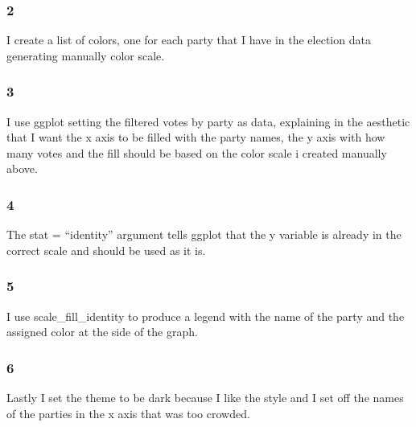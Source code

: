 \documentclass[
]{article}
\begin{document}
\hypertarget{section-3}{%
\subsubsection{2}\label{section-3}}

I create a list of colors, one for each party that I have in the
election data generating manually color scale.

\hypertarget{section-4}{%
\subsubsection{3}\label{section-4}}

I use ggplot setting the filtered votes by party as data, explaining in
the aesthetic that I want the x axis to be filled with the party names,
the y axis with how many votes and the fill should be based on the color
scale i created manually above.

\hypertarget{section-5}{%
\subsubsection{4}\label{section-5}}

The stat = ``identity'' argument tells ggplot that the y variable is
already in the correct scale and should be used as it is.

\hypertarget{section-6}{%
\subsubsection{5}\label{section-6}}

I use scale\_fill\_identity to produce a legend with the name of the
party and the assigned color at the side of the graph.

\hypertarget{section-7}{%
\subsubsection{6}\label{section-7}}

Lastly I set the theme to be dark because I like the style and I set off
the names of the parties in the x axis that was too crowded.
\end{document}
